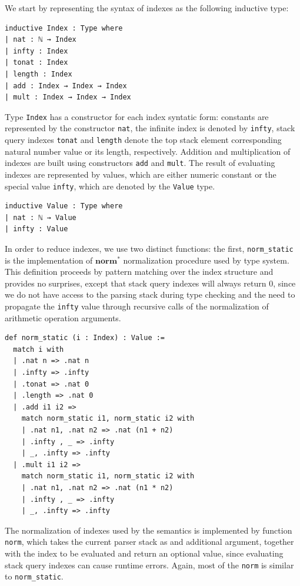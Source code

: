 \documentclass[preprint,12pt]{elsarticle}
\theoremstyle{definition}
\begin{document}
We start by representing the syntax of indexes as the following
inductive type:
\begin{lstlisting}
inductive Index : Type where
| nat : ℕ → Index
| infty : Index
| tonat : Index
| length : Index
| add : Index → Index → Index
| mult : Index → Index → Index
\end{lstlisting}
Type \lstinline|Index| has a constructor for each index syntatic form: constants
are represented by the constructor \lstinline|nat|, the infinite index is denoted
by \lstinline|infty|, stack query indexes \lstinline|tonat| and \lstinline|length|
denote the top stack element corresponding natural number value or its length, respectively.
Addition and multiplication of indexes are built using constructors \lstinline|add| and
\lstinline|mult|. The result of evaluating indexes are represented by values,
which are either numeric
constant or the special value \lstinline|infty|, which are denoted by the \lstinline|Value|
type.
\begin{lstlisting}
inductive Value : Type where
| nat : ℕ → Value
| infty : Value
\end{lstlisting}
In order to reduce indexes, we use two distinct functions: the first, \lstinline|norm_static|
is the implementation of $\mathbf{norm}^*$ normalization procedure used by type system.
This definition proceeds by pattern matching over the index structure and provides no
surprises, except that stack query indexes will always return 0, since we do not have access
to the parsing stack during type checking and the need to propagate the \lstinline|infty|
value through recursive calls of the normalization of arithmetic operation arguments.
\begin{lstlisting}
def norm_static (i : Index) : Value :=
  match i with
  | .nat n => .nat n
  | .infty => .infty
  | .tonat => .nat 0
  | .length => .nat 0
  | .add i1 i2 =>
    match norm_static i1, norm_static i2 with
    | .nat n1, .nat n2 => .nat (n1 + n2)
    | .infty , _ => .infty
    | _, .infty => .infty
  | .mult i1 i2 =>
    match norm_static i1, norm_static i2 with
    | .nat n1, .nat n2 => .nat (n1 * n2)
    | .infty , _ => .infty
    | _, .infty => .infty
\end{lstlisting}
The normalization of indexes used by the semantics is implemented by function \lstinline|norm|,
which takes the current parser stack as and additional argument, together with the
index to be evaluated and return an optional value, since evaluating stack query indexes can
cause runtime errors. Again, most of the \lstinline|norm| is similar to \lstinline|norm_static|.
\end{document}
